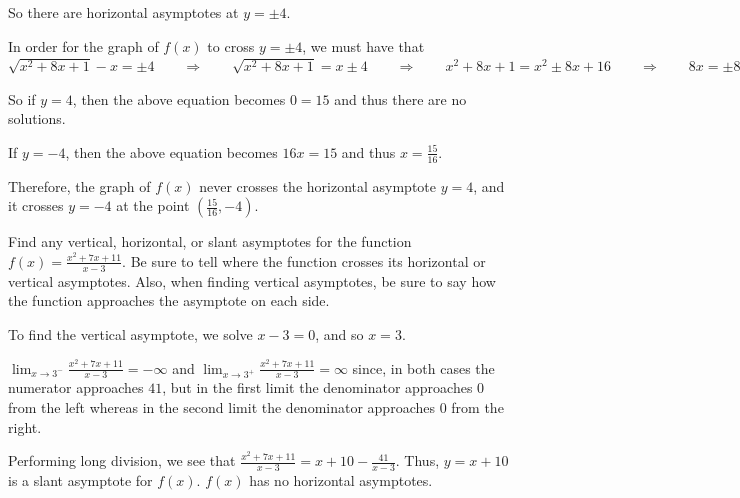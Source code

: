 \documentclass[handout,nooutcomes]{ximera}
\begin{document}
\begin{problem}
\begin{enumerate}
\begin{freeResponse}
		So there are horizontal asymptotes at $y = \pm 4$. 
		
		In order for the graph of $f(x)$ to cross $y = \pm 4$, we must have that 
		$ \sqrt{x^2 + 8x + 1} - x = \pm 4
		\qquad \Longrightarrow \qquad \sqrt{x^2 + 8x + 1} = x \pm 4
		\qquad \Longrightarrow \qquad x^2 + 8x + 1 = x^2 \pm 8x + 16
		\qquad \Longrightarrow \qquad 8x = \pm 8x + 15.$
		
		So if $y = 4$, then the above equation becomes $0 = 15$ and thus there are no solutions.
		
		If $y=-4$, then the above equation becomes $16x = 15$ and thus $x = \frac{15}{16}$.
		
		Therefore, the graph of $f(x)$ never crosses the horizontal asymptote $y = 4$, and it crosses $y = -4$ at the point $\left( \frac{15}{16}, -4 \right)$.  
		
		\end{freeResponse}
	
	\end{enumerate}
	
\end{problem}
			
			
			
			


\begin{problem}	
Find any vertical, horizontal, or slant asymptotes for the function $f(x) = \frac{x^2 + 7x + 11}{x-3}$.  Be sure to tell where the function crosses its horizontal or vertical asymptotes.  Also, when finding vertical asymptotes, be sure to say how the function approaches the asymptote on each side.

		\begin{freeResponse}
		
		To find the vertical asymptote, we solve $x - 3 = 0$, and so $x = 3$.  
		
		$\lim_{x \to 3^-}  \frac{x^2 + 7x + 11}{x-3} = -\infty$ and $\lim_{x \to 3^+}  \frac{x^2 + 7x + 11}{x-3} = \infty$ since, in both cases the numerator approaches $41$, but in the first limit the denominator approaches $0$ from the left whereas in the second limit the denominator approaches $0$ from the right.
		
		  Performing long division, we see that $\frac{x^2 + 7x + 11}{x-3} = x + 10 - \frac{41}{x-3}$.  Thus, $y = x+10$ is a slant asymptote for $f(x)$.  $f(x)$ has no horizontal asymptotes.
		
		\end{freeResponse}
\end{problem}
\end{document}
